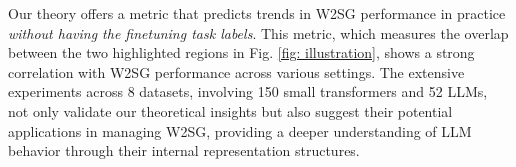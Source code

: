 Our theory offers a metric that predicts trends in W2SG performance in practice \emph{without having the finetuning task labels}. This metric, which measures the overlap between the two highlighted regions in Fig. \ref{fig: illustration}, shows a strong correlation with W2SG performance across various settings.  The extensive experiments across 8 datasets, involving 150 small transformers and 52 LLMs, 
not only validate our theoretical insights but also suggest their potential applications in managing W2SG, providing a deeper understanding of LLM behavior through their internal representation structures. 


